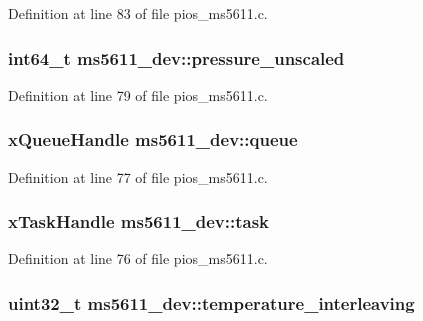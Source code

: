 \-Definition at line 83 of file pios\-\_\-ms5611.\-c.

\hypertarget{structms5611__dev_a06bd507d0e8ff5e0cb6ac32bea05061c}{
\subsubsection[{pressure\-\_\-unscaled}]{\setlength{\rightskip}{0pt plus 5cm}int64\-\_\-t {\bf ms5611\-\_\-dev\-::pressure\-\_\-unscaled}}}\label{structms5611__dev_a06bd507d0e8ff5e0cb6ac32bea05061c}


\-Definition at line 79 of file pios\-\_\-ms5611.\-c.

\hypertarget{structms5611__dev_a72daf619c834a91f065403ba600b79d5}{
\subsubsection[{queue}]{\setlength{\rightskip}{0pt plus 5cm}x\-Queue\-Handle {\bf ms5611\-\_\-dev\-::queue}}}\label{structms5611__dev_a72daf619c834a91f065403ba600b79d5}


\-Definition at line 77 of file pios\-\_\-ms5611.\-c.

\hypertarget{structms5611__dev_a1c3007a7e12067eb6c4b2e42d0991f69}{
\subsubsection[{task}]{\setlength{\rightskip}{0pt plus 5cm}x\-Task\-Handle {\bf ms5611\-\_\-dev\-::task}}}\label{structms5611__dev_a1c3007a7e12067eb6c4b2e42d0991f69}


\-Definition at line 76 of file pios\-\_\-ms5611.\-c.

\hypertarget{structms5611__dev_afc179b4b564d92758f6ae8028f900a0d}{
\subsubsection[{temperature\-\_\-interleaving}]{\setlength{\rightskip}{0pt plus 5cm}uint32\-\_\-t {\bf ms5611\-\_\-dev\-::temperature\-\_\-interleaving}}}\label{structms5611__dev_afc179b4b564d92758f6ae8028f900a0d}


